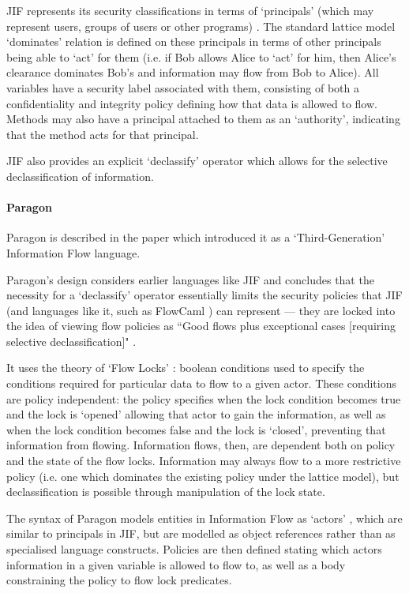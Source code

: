 JIF represents its security classifications in terms of `principals' (which may represent users, groups of users or other programs) \cite{pullicino2014jif}. The standard lattice model `dominates' relation is defined on these principals in terms of other principals being able to `act' for them (i.e. if Bob allows Alice to `act' for him, then Alice's clearance dominates Bob's and information may flow from Bob to Alice). All variables have a security label associated with them, consisting of both a confidentiality and integrity policy defining how that data is allowed to flow. Methods may also have a principal attached to them as an `authority', indicating that the method acts for that principal.

JIF also provides an explicit `declassify' operator which allows for the selective declassification of information.

\paragraph{Paragon}

Paragon is described in the paper which introduced it \cite{broberg2013paragon} as a `Third-Generation' Information Flow language.

Paragon's design considers earlier languages like JIF and concludes that the necessity for a `declassify' operator essentially limits the security policies that JIF (and languages like it, such as FlowCaml \cite{simonet2003flow}) can represent --- they are locked into the idea of viewing flow policies as ``Good flows plus exceptional cases [requiring selective declassification]" \cite{broberg2013paragon}.

It uses the theory of `Flow Locks' \cite{broberg2010paralocks}: boolean conditions used to specify the conditions required for particular data to flow to a given actor. These conditions are policy independent: the policy specifies when the lock condition becomes true and the lock is `opened' allowing that actor to gain the information, as well as when the lock condition becomes false and the lock is `closed', preventing that information from flowing. Information flows, then, are dependent both on policy and the state of the flow locks. Information may always flow to a more restrictive policy (i.e. one which dominates the existing policy under the lattice model), but declassification is possible through manipulation of the lock state.

The syntax of Paragon models entities in Information Flow as `actors' \cite{broberg2013paragon}, which are similar to principals in JIF, but are modelled as object references rather than as specialised language constructs. Policies are then defined stating which actors information in a given variable is allowed to flow to, as well as a body constraining the policy to flow lock predicates.

